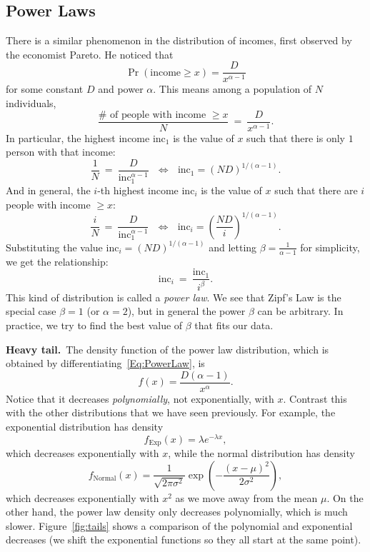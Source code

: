 \documentclass[11pt]{article}
\newcommand{\inc}{\text{inc}}
\begin{document}
\subsection*{Power Laws}

There is a similar phenomenon in the distribution of incomes, first observed by the economist Pareto. He noticed that
\begin{equation}\label{Eq:PowerLaw}
\Pr(\text{income} \ge x) = \frac{D}{x^{\alpha-1}}
\end{equation}
for some constant $D$ and power $\alpha$. This means among a population of $N$ individuals,
$$\frac{\#\text{ of people with income } \ge x}{N} ~=~ \frac{D}{x^{\alpha-1}}.$$
In particular, the highest income $\inc_1$ is the value of $x$ such that there is only $1$ person with that income:
$$\frac{1}{N} ~=~ \frac{D}{\inc_1^{\alpha-1}} ~~~\Leftrightarrow~~~ \inc_1 = (ND)^{1/(\alpha-1)}.$$
And in general, the $i$-th highest income $\inc_i$ is the value of $x$ such that there are $i$ people with income $\ge x$:
$$\frac{i}{N} ~=~ \frac{D}{\inc_1^{\alpha-1}} ~~~\Leftrightarrow~~~ \inc_i = \left(\frac{ND}{i}\right)^{1/(\alpha-1)}.$$
Substituting the value $\inc_i = (ND)^{1/(\alpha-1)}$ and letting $\beta = \frac{1}{\alpha-1}$ for simplicity, we get the relationship:
$$\inc_i ~=~ \frac{\inc_1}{i^\beta}.$$
This kind of distribution is called a {\em power law}. We see that Zipf's Law is the special case $\beta = 1$ (or $\alpha = 2$), but in general the power $\beta$ can be arbitrary. In practice, we try to find the best value of $\beta$ that fits our data.


\medskip
{\bf Heavy tail.}~The density function of the power law distribution, which is obtained by differentiating~\eqref{Eq:PowerLaw}, is
$$f(x) = \frac{D(\alpha-1)}{x^\alpha}.$$
Notice that it decreases {\em polynomially}, not exponentially, with $x$. Contrast this with the other distributions that we have seen previously. For example, the exponential distribution has density
$$f_{\text{Exp}}(x) = \lambda e^{-\lambda x},$$
which decreases exponentially with $x$, while the normal distribution has density
$$f_{\text{Normal}}(x) = \frac{1}{\sqrt{2\pi\sigma^2}} \exp\left(-\frac{(x-\mu)^2}{2\sigma^2}\right),$$
which decreases exponentially with $x^2$ as we move away from the mean $\mu$. On the other hand, the power law density only decreases polynomially, which is much slower. Figure~\ref{fig:tails} shows a comparison of the polynomial and exponential decreases (we shift the exponential functions so they all start at the same point).
\end{document}
